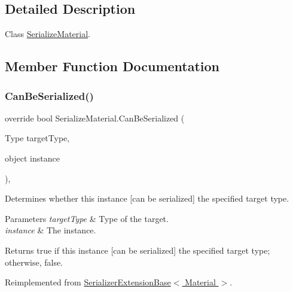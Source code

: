 \subsection{Detailed Description}
Class \hyperlink{class_serialize_material}{Serialize\+Material}. 



\subsection{Member Function Documentation}
\mbox{\label{class_serialize_material_a86d5a8507905179b0d5cc0ca608c552b}} 
\subsubsection{\texorpdfstring{Can\+Be\+Serialized()}{CanBeSerialized()}}
{\footnotesize\ttfamily override bool Serialize\+Material.\+Can\+Be\+Serialized (\begin{DoxyParamCaption}\item[{Type}]{target\+Type,  }\item[{object}]{instance }\end{DoxyParamCaption})\hspace{0.3cm}{\ttfamily [inline]}, {\ttfamily [virtual]}}



Determines whether this instance \mbox{[}can be serialized\mbox{]} the specified target type. 


\begin{DoxyParams}{Parameters}
{\em target\+Type} & Type of the target.\\
\hline
{\em instance} & The instance.\\
\hline
\end{DoxyParams}
\begin{DoxyReturn}{Returns}
{\ttfamily true} if this instance \mbox{[}can be serialized\mbox{]} the specified target type; otherwise, {\ttfamily false}.
\end{DoxyReturn}


Reimplemented from \hyperlink{class_serializer_extension_base_a50e69037fda6bdcc080cdc3c51d25b99}{Serializer\+Extension\+Base$<$ Material $>$}.

\mbox{\label{class_serialize_material_ae371882b5aece27aafec190d488fc97f}} 
